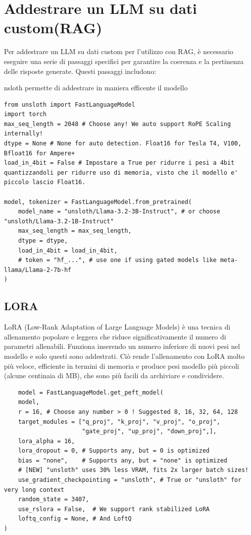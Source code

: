 \documentclass[12pt,a4paper,openright,twoside]{book}
\begin{document}
\chapter{Addestrare un LLM su dati custom(RAG)}
Per addestrare un LLM su dati custom per l'utilizzo con RAG, è necessario eseguire una serie di passaggi specifici per garantire la coerenza e la pertinenza delle risposte generate. Questi passaggi includono:


nsloth permette di addestrare in maniera efficente il modello

\begin{lstlisting}
from unsloth import FastLanguageModel
import torch
max_seq_length = 2048 # Choose any! We auto support RoPE Scaling internally!
dtype = None # None for auto detection. Float16 for Tesla T4, V100, Bfloat16 for Ampere+
load_in_4bit = False # Impostare a True per ridurre i pesi a 4bit quantizzandoli per ridurre uso di memoria, visto che il modello e' piccolo lascio Float16. 

model, tokenizer = FastLanguageModel.from_pretrained(
    model_name = "unsloth/Llama-3.2-3B-Instruct", # or choose "unsloth/Llama-3.2-1B-Instruct"
    max_seq_length = max_seq_length,
    dtype = dtype,
    load_in_4bit = load_in_4bit,
    # token = "hf_...", # use one if using gated models like meta-llama/Llama-2-7b-hf
)
\end{lstlisting}

\section{LORA}
LoRA (Low-Rank Adaptation of Large Language Models)
è una tecnica di allenamento popolare e leggera che riduce significativamente il numero di parametri allenabili. Funziona inserendo un numero inferiore di nuovi pesi nel modello e solo questi sono addestrati. Ciò rende l'allenamento con LoRA molto più veloce, efficiente in termini di memoria e produce pesi modello più piccoli (alcune centinaia di MB), che sono più facili da archiviare e condividere.

\begin{lstlisting}
    model = FastLanguageModel.get_peft_model(
    model,
    r = 16, # Choose any number > 0 ! Suggested 8, 16, 32, 64, 128
    target_modules = ["q_proj", "k_proj", "v_proj", "o_proj",
                      "gate_proj", "up_proj", "down_proj",],
    lora_alpha = 16,
    lora_dropout = 0, # Supports any, but = 0 is optimized
    bias = "none",    # Supports any, but = "none" is optimized
    # [NEW] "unsloth" uses 30% less VRAM, fits 2x larger batch sizes!
    use_gradient_checkpointing = "unsloth", # True or "unsloth" for very long context
    random_state = 3407,
    use_rslora = False,  # We support rank stabilized LoRA
    loftq_config = None, # And LoftQ
)
\end{lstlisting}
\end{document}

